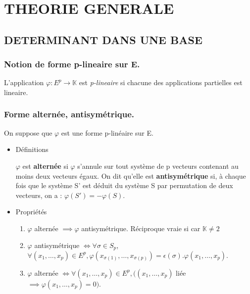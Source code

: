 \documentclass[a4paper,12pt]{article}
\title{\letitle}
\author{\leauthor}
\date{}
\begin{document}
    \section{THEORIE GENERALE}

\subsection{DETERMINANT DANS UNE BASE}

\subsubsection{Notion de forme p-lineaire sur E.}

L'application $\varphi:E^p \rightarrow \mathbb{K}$ est {\it p-lineaire}
si chacune des applications partielles est lineaire.

\subsubsection{Forme alternée, antisymétrique.}

On suppose que $\varphi$ est une forme p-linéaire sur E.
\begin{itemize}
\item Définitions

$\varphi$ est \textbf{ alternée } si $\varphi$ s’annule sur tout système de p vecteurs contenant au moins
deux vecteurs égaux. On dit qu’elle est \textbf{ antisymétrique } si, à chaque fois que le système S'
est déduit du système S par permutation de deux vecteurs, on a : $\varphi(S')=-\varphi(S)$.


\item Propriétés

\begin{enumerate}
\item $\varphi$ alternée $\implies \varphi$ antisymétrique. Réciproque vraie si car $\mathbb{K}\neq 2$

\item $\varphi$ 
antisymétrique
$\iff \forall \sigma \in S_p$, $\forall (x_1,\hdots,x_p) 
\in E^p, \varphi(x_{\sigma(1)},\hdots,x_{\sigma(p)})=\epsilon (\sigma).\varphi(x_1,\hdots,x_p)$.

\item $\varphi$ 
alternée
$\iff \forall (x_1,\hdots,x_p)\in E^p, ((x_1,\hdots,x_p)$
liée
$\implies \varphi (x_1,\hdots,x_p) = 0)$.
\end{enumerate}
\end{itemize}
\end{document}
